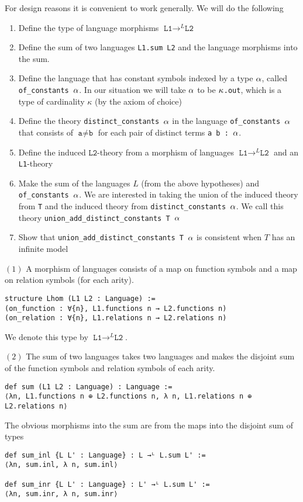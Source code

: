 For design reasons it is convenient to work generally.
We will do the following
\begin{enumerate}
  \item Define the type of language morphisms $\texttt{L1} \to^{L} \texttt{L2}$
  \item Define the sum of two languages \texttt{L1.sum L2}
        and the language morphisms into the sum.
  \item Define the language that has constant symbols indexed by a type $\alpha$,
        called \texttt{of\_constants $\alpha$}.
        In our situation we will take $\alpha$ to be \texttt{$\kappa$.out},
        which is a type of cardinality $\kappa$ (by the axiom of choice)
  \item Define the theory \texttt{distinct\_constants $\alpha$}
        in the language \texttt{of\_constants $\alpha$}
        that consists of $\texttt{a} \ne \texttt{b}$
        for each pair of distinct terms \texttt{a b : $\alpha$}.
  \item Define the induced $\texttt{L2}$-theory
        from a morphism of languages $\texttt{L1} \to^{L} \texttt{L2}$ and
        an \texttt{L1}-theory
  \item Make the sum of the languages $L$ (from the above hypotheses)
        and \texttt{of\_constants $\alpha$}.
        We are interested in taking the union of the induced theory from \texttt{T}
        and the induced theory from
        \texttt{distinct\_constants $\alpha$}.
        We call this theory \texttt{union\_add\_distinct\_constants T $\alpha$}
  \item Show that \texttt{union\_add\_distinct\_constants T $\alpha$} is consistent
        when $T$ has an infinite model
\end{enumerate}

$(1)$ A morphism of languages consists of a map on function symbols
and a map on relation symbols (for each arity).
\begin{lstlisting}
structure Lhom (L1 L2 : Language) :=
(on_function : ∀{n}, L1.functions n → L2.functions n)
(on_relation : ∀{n}, L1.relations n → L2.relations n) \end{lstlisting}
We denote this type by $\texttt{L1} \to^{L} \texttt{L2}$.

$(2)$ The sum of two languages takes two languages and makes the
disjoint sum of the function symbols and relation symbols of
each arity.
\begin{lstlisting}
def sum (L1 L2 : Language) : Language :=
⟨λn, L1.functions n ⊕ L2.functions n, λ n, L1.relations n ⊕ L2.relations n⟩ \end{lstlisting}
The obvious morphisms into the sum are from the maps into the disjoint
sum of types
\begin{lstlisting}
def sum_inl {L L' : Language} : L →ᴸ L.sum L' :=
⟨λn, sum.inl, λ n, sum.inl⟩

def sum_inr {L L' : Language} : L' →ᴸ L.sum L' :=
⟨λn, sum.inr, λ n, sum.inr⟩ \end{lstlisting}

